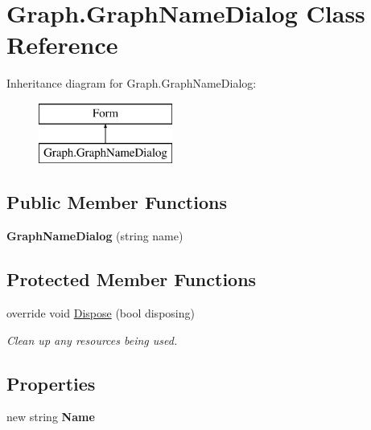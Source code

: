 \hypertarget{class_graph_1_1_graph_name_dialog}{}\section{Graph.\+Graph\+Name\+Dialog Class Reference}
\label{class_graph_1_1_graph_name_dialog}
Inheritance diagram for Graph.\+Graph\+Name\+Dialog\+:\begin{figure}[H]
\begin{center}
\leavevmode
\includegraphics[height=2.000000cm]{class_graph_1_1_graph_name_dialog}
\end{center}
\end{figure}
\subsection*{Public Member Functions}
\begin{DoxyCompactItemize}
\item 
\mbox{\label{class_graph_1_1_graph_name_dialog_ab84715b9cbe7bbf5a923739f80180a94}} 
{\bfseries Graph\+Name\+Dialog} (string name)
\end{DoxyCompactItemize}
\subsection*{Protected Member Functions}
\begin{DoxyCompactItemize}
\item 
override void \hyperlink{class_graph_1_1_graph_name_dialog_a81b7a2704a245cf0cf74675f7bd01957}{Dispose} (bool disposing)
\begin{DoxyCompactList}\small\item\em Clean up any resources being used. \end{DoxyCompactList}\end{DoxyCompactItemize}
\subsection*{Properties}
\begin{DoxyCompactItemize}
\item 
\mbox{\label{class_graph_1_1_graph_name_dialog_a1b955082f51e862fded585e8d87c223e}} 
new string {\bfseries Name}
\end{DoxyCompactItemize}


